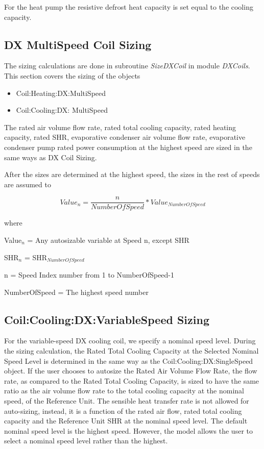 For the heat pump the resistive defrost heat capacity is set equal to the cooling capacity.

\subsection{DX MultiSpeed Coil Sizing}\label{dx-multispeed-coil-sizing}

The sizing calculations are done in subroutine \emph{SizeDXCoil} in module \emph{DXCoils}. This section covers the sizing of the objects

\begin{itemize}
\item
  Coil:Heating:DX:MultiSpeed
\item
  Coil:Cooling:DX: MultiSpeed
\end{itemize}

The rated air volume flow rate, rated total cooling capacity, rated heating capacity, rated SHR, evaporative condenser air volume flow rate, evaporative condenser pump rated power consumption at the highest speed are sized in the same ways as DX Coil Sizing.

After the sizes are determined at the highest speed, the sizes in the rest of speeds are assumed to

\begin{equation}
Valu{e_n} = \frac{n}{{NumberOfSpeed}}*Valu{e_{NumberOfSpeed}}
\end{equation}

where

Value\(_{n}\) = Any autosizable variable at Speed n, except SHR

SHR\(_{n}\) = SHR\(_{NumberOfSpeed}\)

n = Speed Index number from 1 to NumberOfSpeed-1

NumberOfSpeed = The highest speed number

\subsection{Coil:Cooling:DX:VariableSpeed Sizing}\label{coilcoolingdxvariablespeed-sizing}

For the variable-speed DX cooling coil, we specify a nominal speed level. During the sizing calculation, the Rated Total Cooling Capacity at the Selected Nominal Speed Level is determined in the same way as the Coil:Cooling:DX:SingleSpeed object. If the user chooses to autosize the Rated Air Volume Flow Rate, the flow rate, as compared to the Rated Total Cooling Capacity, is sized to have the same ratio as the air volume flow rate to the total cooling capacity at the nominal speed, of the Reference Unit. The sensible heat transfer rate is not allowed for auto-sizing, instead, it is a function of the rated air flow, rated total cooling capacity and the Reference Unit SHR at the nominal speed level. The default nominal speed level is the highest speed. However, the model allows the user to select a nominal speed level rather than the highest.

